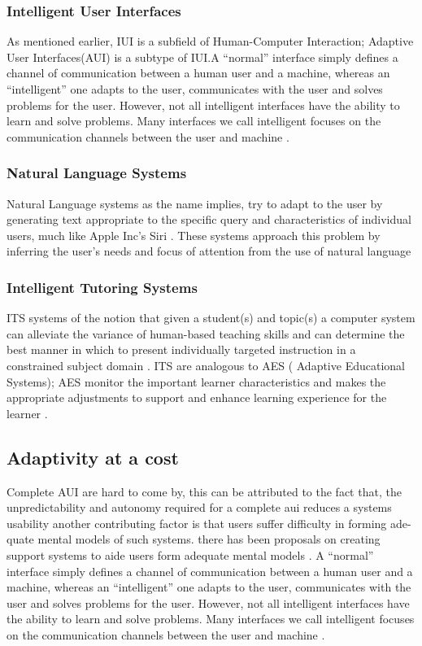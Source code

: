 \subsubsection{Intelligent User Interfaces}
As mentioned earlier, IUI is a subfield of Human-Computer Interaction; Adaptive User Interfaces(AUI) is a subtype of IUI.A ``normal'' interface simply defines a channel of communication between a human user and a machine, whereas an ``intelligent'' one adapts to the user, communicates with the user and solves problems for the user.
However, not all intelligent interfaces have the ability to learn and solve problems. Many interfaces we call intelligent focuses on the communication channels between the user and machine \cite{patrick2003intelligent}.
\subsubsection{Natural Language Systems}
Natural Language systems as the name implies, try to adapt to the user by generating text appropriate to the specific query and characteristics of individual users, much like Apple Inc's Siri \cite{website:SIRI}. These systems approach this problem by inferring the user's needs and focus of attention from the use of natural language \cite{benyon1993adaptive}
\subsubsection{Intelligent Tutoring Systems}
ITS systems of the notion that given a student(s) and topic(s) a computer system can alleviate the variance of human-based teaching skills and can determine the best manner in which to present individually targeted instruction in a constrained subject domain \cite{benyon1993adaptive}. ITS are analogous to AES ( Adaptive Educational Systems); AES monitor the important learner characteristics and makes the appropriate adjustments to support and enhance learning experience for the learner \cite{shute2012adaptive}.
\subsection{Adaptivity at a cost}
Complete AUI are hard to come by, this can be attributed to the fact that, the unpredictability and autonomy required for a complete aui reduces a systems usability 
another contributing factor is that users suffer difficulty in forming ade- quate mental models of such systems. there has been proposals on creating support systems to aide users form adequate mental models \cite{paymans2004usability}. A ``normal'' interface simply defines a channel of communication between a human user and a machine, whereas an ``intelligent'' one adapts to the user, communicates with the user and solves problems for the user.
However, not all intelligent interfaces have the ability to learn and solve problems. Many interfaces we call intelligent focuses on the communication channels between the user and machine \cite{patrick2003intelligent}.
